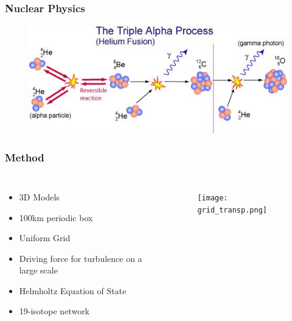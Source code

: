 \documentclass{beamer}
\begin{document}

\begin{frame}
\frametitle{Nuclear Physics}

        \begin{figure}
    \begin{center}
      \includegraphics[width=.90\linewidth]{triplealphaflash.jpg}
    \end{center}
  \end{figure}

\end{frame}


\begin{frame}
\frametitle{Method}

\begin{columns}[c]
        \begin{itemize}
                \item 3D Models
                \item 100km periodic box
		\item Uniform Grid
		\item Driving force for turbulence on a large scale
		\item Helmholtz Equation of State
		\item 19-isotope network
        \end{itemize}


        \vspace{25pt}
        \begin{figure}
    \begin{center}
      \texttt{[image: grid\_transp.png]}
    \end{center}
  \end{figure}

        \end{columns}

\end{frame}
\end{document}
